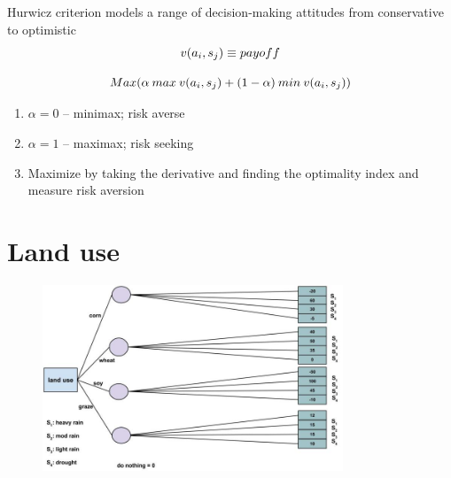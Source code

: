 \documentclass[aspectratio=1610,pdftex,dvipsnames,compress,xcolor={dvipsnames}]{beamer}
\begin{document}
\addtocounter{framenumber}{-1}
\begin{frame}{Hurwicz criterion models a range of decision-making attitudes from conservative to optimistic}
    \begin{equation}
        \LARGE
        v(a_i,s_j) \equiv payoff
    \end{equation}

    \begin{equation}
        \LARGE
        Max(\alpha \: max \: v(a_i,s_j)+(1-\alpha) \: min \: v(a_i,s_j))
    \end{equation}

    \begin{enumerate}[series=outerlist,topsep=0pt,itemsep=11pt,leftmargin=*,label=(\arabic*)]
        \item[]$\alpha = 0$ -- minimax; risk averse
        \item[]$\alpha = 1$ -- maximax; risk seeking
        \item[]Maximize by taking the derivative and finding the optimality index and measure risk aversion
    \end{enumerate}
\end{frame}


\section{Land use}


\addtocounter{framenumber}{-1}
\begin{frame}{}
    \begin{figure}
        \centering
        \includegraphics[width=0.80\textwidth]{land.use.template.jpg}
    \end{figure}
\end{frame}
\end{document}
